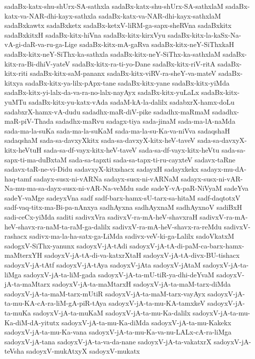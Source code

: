 {sadaBx-katx-shu-shUrx-SA-sathxla
sadaBx-katx-shu-shUrx-SA-sathxlaM
sadaBx-katx-va-NAR-dhi-kayx-sathxla
sadaBx-katx-va-NAR-dhi-kayx-sathxlaM
sadaBxkawtx
sadaBxketx
sadaBx-ketxV-liRM-ga-sapx-sheRVna
sadaBxkitx
sadaBxkitxH
sadaBx-kitx-hiVna
sadaBx-kitx-kirxVyu
sadaBx-kitx-la-kaSx-Na-vA-gi-daR-va-ru-ga-Lige
sadaBx-kitx-mA-gaRva
sadaBx-kitx-neY-SiThxkaH
sadaBx-kitx-neY-SiThx-ka-sathxla
sadaBx-kitx-neY-SiThx-ka-sathxlaM
sadaBx-kitx-ra-Bi-dhiV-yateV
sadaBx-kitx-ra-ti-yo-Dane
sadaBx-kitx-riV-ritA
sadaBx-kitx-riti
sadaBx-kitx-saM-pananx
sadaBx-kitx-viRV-ra-sheY-va-mateV
sadaBx-kitxya
sadaBx-kitx-ya-lilx-pApx-tane
sadaBx-kitx-yane
sadaBx-kitx-yiMda
sadaBx-kitx-yi-lalx-da-va-ra-no-lalx-nayAyx
sadaBx-kitx-yuLaLx
sadaBx-kitx-yuMTu
sadaBx-kitx-yu-katx-vAda
sadaM-kA-la-dalilx
sadabxrX-hamx-doLu
sadabxrX-hamx-vA-dudu
sadadhx-maR-diV-pike
sadadhx-maRmaM
sadadhx-maR-piV-Thada
sadadhx-maRvu
sadagx-tiya
sada-jinaM
sada-ma-lA-naMda
sada-ma-la-suKa
sada-ma-la-suKaM
sada-ma-la-su-Ka-va-niVva
sadaqshaH
sadaqshaM
sada-sa-davxyXkitx
sada-sa-davxyX-kitx-heV-taveV
sada-sa-davxyX-kitx-heVtuH
sada-sa-df-vayx-kitx-heV-taveV
sada-sa-df-vayx-kitx-heVtu
sada-sa-sapx-ti-ma-duBxtaM
sada-sa-tapxti
sada-sa-tapx-ti-ru-cayxteV
sadavx-taRne
sadavx-taR-ne-vi-Didu
sadavxyX-kitxshacx
sadayxH
sadayxkekx
sadayx-mu-dA-haq-tamf
sadayx-susx-ni-vARNa
sadayx-susx-ni-vARNaM
sadayx-susx-ni-vAR-Na-mu-ma-sa-dayx-susx-ni-vAR-Na-veMdu
sade
sadeY-vA-paR-NiVyaM
sadeYva
sadeY-vaMge
sadeyxVna
sadf
sadf-barx-hamx-sU-tarx-sa-hitaM
sadf-daqtotxV
sadf-vaq-titx-ma-Bi-pa-nAnxya
sadhAyxna
sadhAyxnaM
sadhAyxnoV
sadiBxH
sadi-ceCx-yiMda
saditi
sadivxVra
sadivxV-ra-mA-heV-shavxraH
sadivxV-ra-mA-heV-shavx-ra-naM-ta-raM-ga-dalilx
sadivxV-ra-mA-heV-shavx-ra-reMdu
sadivxV-rashacx
sadivx-ma-la-ha-satx-ga-LiMda
sadivx-veV-ki-ga-Lalilx
sadoVkatxM
sadogxV-SiThx-yanunx
sadoyxV-jA-tAdi
sadoyxV-jA-tA-di-paM-ca-barx-hamx-maMterxYH
sadoyxV-jA-tA-di-va-katxrXtaH
sadoyxV-jA-tA-divx-BU-tishacx
sadoyxV-jA-tAtf
sadoyxV-jA-tAya
sadoyxV-jAta
sadoyxV-jAtaM
sadoyxV-jA-ta-liMga
sadoyxV-jA-ta-liM-gada
sadoyxV-jA-ta-mU-tiR-ya-dhi-deYvaM
sadoyxV-jA-ta-maMtarx
sadoyxV-jA-ta-maMtarxH
sadoyxV-jA-ta-maM-tarx-diMda
sadoyxV-jA-ta-maM-tarx-mUtiR
sadoyxV-jA-ta-maM-tarx-vayAyx
sadoyxV-jA-ta-mu-KA-cA-ra-liM-gA-piR-tAya
sadoyxV-jA-ta-mu-KA-tamxkeV
sadoyxV-jA-ta-muKa
sadoyxV-jA-ta-muKaM
sadoyxV-jA-ta-mu-Ka-dalilx
sadoyxV-jA-ta-mu-Ka-diM-dA-yitutx
sadoyxV-jA-ta-mu-Ka-diMda
sadoyxV-jA-ta-mu-Kakekx
sadoyxV-jA-ta-mu-Ka-vana
sadoyxV-jA-ta-mu-Ka-va-nu-LALx-cA-ra-liMga
sadoyxV-jA-tana
sadoyxV-jA-ta-va-da-nane
sadoyxV-jA-ta-vakatxrX
sadoyxV-jA-teVsha
sadoyxV-mukAtxyX
sadoyxV-mukatx
}
